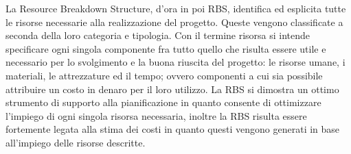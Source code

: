La Resource Breakdown Structure, d'ora in poi RBS, identifica ed esplicita tutte le
risorse necessarie alla realizzazione del progetto. Queste vengono classificate a seconda della
loro categoria e tipologia. Con il termine risorsa si intende specificare ogni singola
componente fra tutto quello che risulta essere utile e necessario per lo svolgimento e la
buona riuscita del progetto: le risorse umane, i materiali, le attrezzature ed il tempo;
ovvero componenti a cui sia possibile attribuire un costo in denaro per il loro utilizzo. La
RBS si dimostra un ottimo strumento di supporto alla pianificazione in quanto consente
di ottimizzare l'impiego di ogni singola risorsa necessaria, inoltre la RBS risulta essere fortemente
legata alla stima dei costi in quanto questi vengono generati in base all'impiego delle
risorse descritte.

